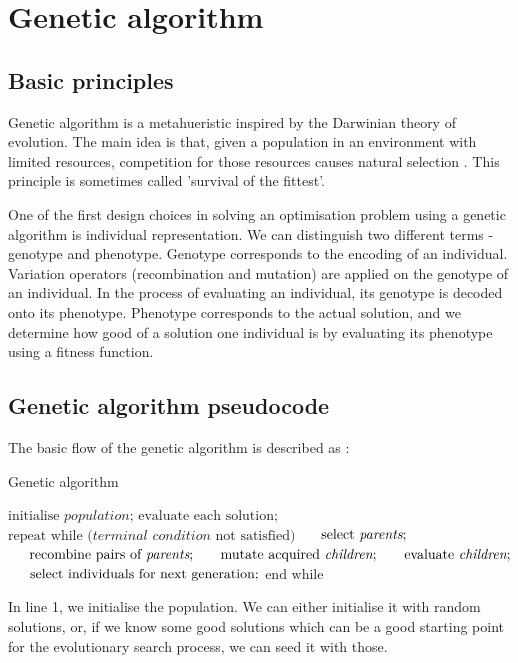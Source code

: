 \section{Genetic algorithm}
\subsection{Basic principles}
Genetic algorithm is a metahueristic inspired by the Darwinian theory of evolution. The main idea is that, given a population in an environment with limited resources, competition for those resources causes natural selection \citep{eiben2015evolutionarycomputing}.  This principle is sometimes called 'survival of the fittest'. 

One of the first design choices in solving an optimisation problem using a genetic algorithm is individual representation. We can distinguish two different terms - genotype and phenotype. Genotype corresponds to the encoding of an individual. Variation operators (recombination and mutation) are applied on the genotype of an individual. In the process of evaluating an individual, its genotype is decoded onto its phenotype. Phenotype corresponds to the actual solution, and we determine how good of a solution one individual is by evaluating its phenotype using a fitness function.

\subsection{Genetic algorithm pseudocode}
The basic flow of the genetic algorithm is described as \citep{eiben2015evolutionarycomputing}:

\begin{algorithm}[]
\caption{Genetic algorithm}
\begin{algorithmic}[1]
\State $\text{initialise } \textit{population} \text{;}$
\State $\text{evaluate } \text{each solution};$
\State $\text{repeat while (} \textit{terminal condition} \text{ not satisfied)}$
\State $\indent \text{select } \textit{parents} \text{;}$
\State $\indent \text{recombine pairs of } \textit{parents} \text{;}$
\State $\indent \text{mutate acquired } \textit{children} \text{;}$
\State $\indent \text{evaluate } \textit{children} \text{;}$
\State $\indent \text{select individuals for next generation;}$
\State $\text{end while}$
\end{algorithmic}
\end{algorithm}

In line 1, we initialise the population. We can either initialise it with random solutions, or, if we know some good solutions which can be a good starting point for the evolutionary search process, we can seed it with those.

